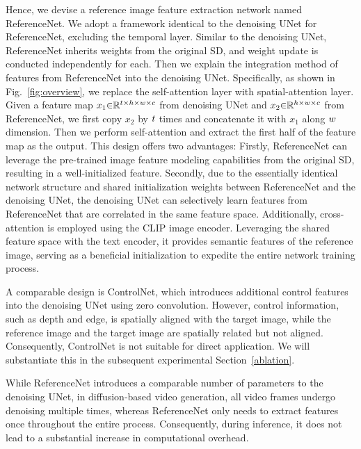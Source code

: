 Hence, we devise a reference image feature extraction network named ReferenceNet. We adopt a framework identical to the denoising UNet for ReferenceNet, excluding the temporal layer. Similar to the denoising UNet, ReferenceNet inherits weights from the original SD, and weight update is conducted independently for each.
Then we explain the integration method of features from ReferenceNet into the denoising UNet. 
Specifically, as shown in Fig.~\ref{fig:overview}, we replace the self-attention layer with spatial-attention layer. Given a feature map ${x}_{1} {\in} {\mathbb R}^{{\mathnormal t}{\times}{\mathnormal h}{\times}{\mathnormal w}{\times}{\mathnormal c}}$ from denoising UNet and ${x}_{2} {\in} {\mathbb R}^{{\mathnormal h}{\times}{\mathnormal w}{\times}{\mathnormal c}}$ from ReferenceNet, we first copy ${x}_{2}$ by $\mathnormal t$ times and concatenate it with ${x}_{1}$ along $\mathnormal w$ dimension. Then we perform self-attention and extract the first half of the feature map as the output. This design offers two advantages: Firstly, ReferenceNet can leverage the pre-trained image feature modeling capabilities from the original SD, resulting in a well-initialized feature. Secondly, due to the essentially identical network structure and shared initialization weights between ReferenceNet and the denoising UNet, the denoising UNet can selectively learn features from ReferenceNet that are correlated in the same feature space.
Additionally, cross-attention is employed using the CLIP image encoder. Leveraging the shared feature space with the text encoder, it provides semantic features of the reference image, serving as a beneficial initialization to expedite the entire network training process.

A comparable design is ControlNet\cite{controlnet}, which introduces additional control features into the denoising UNet using zero convolution. However, control information, such as depth and edge, is spatially aligned with the target image, while the reference image and the target image are spatially related but not aligned. Consequently, ControlNet is not suitable for direct application. We will substantiate this in the subsequent experimental Section~\ref{ablation}.

While ReferenceNet introduces a comparable number of parameters to the denoising UNet, in diffusion-based video generation, all video frames undergo denoising multiple times, whereas ReferenceNet only needs to extract features once throughout the entire process. Consequently, during inference, it does not lead to a substantial increase in computational overhead.

